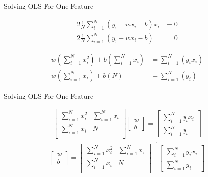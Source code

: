\documentclass[serif,xcolor=pdftex,dvipsnames,table,hyperref={bookmarks=false,breaklinks}]{beamer}
\begin{document}
\begin{frame}[t]{Solving OLS For One Feature}

\begin{align*}
2\frac{1}{N}\sum_{i=1}^N(y_i - wx_i-b)x_i&=0\\
2\frac{1}{N}\sum_{i=1}^N(y_i - wx_i-b)&=0
\end{align*}

\pause%
\begin{align*}
w\left(\sum_{i=1}^Nx_i^2\right) + b\left(\sum_{i=1}^Nx_i\right) &=\sum_{i=1}^N(y_ix_i)\\
w\left(\sum_{i=1}^Nx_i\right)+b(N)&= \sum_{i=1}^N(y_i) 
\end{align*}

\end{frame}

\begin{frame}[t]{Solving OLS For One Feature}

\begin{align*}
\begin{bmatrix}
\sum_{i=1}^Nx_i^2 & \sum_{i=1}^Nx_i \\
\sum_{i=1}^Nx_i   & N\\
\end{bmatrix}
\begin{bmatrix}
w\\
b
\end{bmatrix}
=
\begin{bmatrix}
\sum_{i=1}^Ny_ix_i \\
\sum_{i=1}^Ny_i 
\end{bmatrix}
\end{align*}
%
\pause
\begin{align*}
\begin{bmatrix}
w\\
b
\end{bmatrix}
=
\begin{bmatrix}
\sum_{i=1}^Nx_i^2 & \sum_{i=1}^Nx_i \\
\sum_{i=1}^Nx_i   & N\\
\end{bmatrix}^{-1}
\begin{bmatrix}
\sum_{i=1}^Ny_ix_i \\
\sum_{i=1}^Ny_i 
\end{bmatrix}
\end{align*}


\end{frame}
\end{document}
